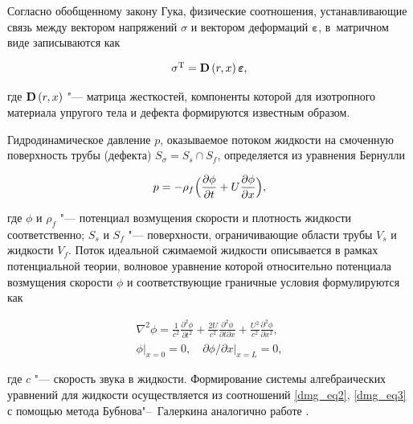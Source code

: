 Согласно обобщенному закону Гука, физические соотношения, устанавливающие связь между вектором напряжений $\sigma$ и вектором деформаций ${\boldsymbol \varepsilon}$, в~матричном виде записываются как

$$

{\sigma ^{\mathop{\rm T}\nolimits} } = {\bf{D}}\left( {r,x} \right){\boldsymbol \varepsilon},

$$

где ${\bf{D}}\left( {r,x} \right)$ "--- матрица жесткостей, компоненты которой для изотропного материала упругого тела и дефекта формируются известным образом.



Гидродинамическое давление $p$, оказываемое потоком жидкости на смоченную поверхность трубы (дефекта) ${S_\sigma } = {S_s} \cap {S_f}$, определяется из уравнения Бернулли \cite{24_Ilgamov}

\begin{equation}\label{dmg_eq1}

p =  - {\rho _f}\Bigl( {\frac{{\partial \phi }}{{\partial t}} + U\frac{{\partial \phi }}{{\partial x}}} \Bigr),	

\end{equation}

где $\phi$ и $\rho _f$ "--- потенциал возмущения скорости и плотность жидкости соответственно; $S_s$ и $S_f$ "--- поверхности, ограничивающие области трубы $V_s$ и жидкости $V_f$. Поток идеальной сжимаемой жидкости описывается в рамках потенциальной теории, волновое уравнение которой относительно потенциала возмущения скорости $\phi$ и соответствующие граничные условия формулируются как

\begin{gather}

\label{dmg_eq2}

{\nabla ^2}\phi  = \frac{1}{{{c^2}}}\frac{{{\partial ^2}\phi }}{{\partial {t^2}}} + \frac{{2U}}{{{c^2}}}\frac{{\partial ^2 \phi }}{{\partial t\partial x}} + \frac{{{U^2}}}{{{c^2}}}\frac{{{\partial ^2}\phi }}{{\partial {x^2}}},\\[2mm]

\label{dmg_eq3}


\phi\big|_{x = 0}  = 0,\quad \partial \phi /  \partial x \big|_{x = L} = 0,	

\end{gather}

где $c$ "--- скорость звука в жидкости. Формирование системы алгебраических уравнений для жидкости осуществляется из соотношений \eqref{dmg_eq2}, \eqref{dmg_eq3} с помощью метода Бубнова"--~Галеркина аналогично работе \cite{25_Bochkarev}.



